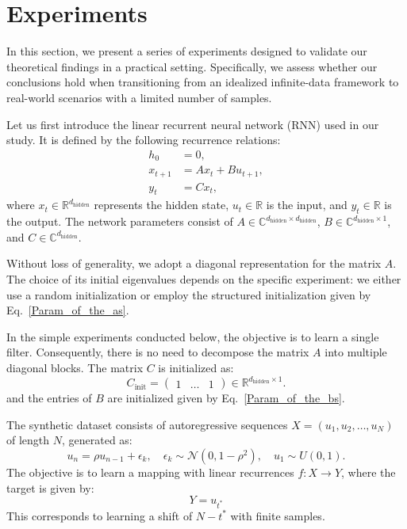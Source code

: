 \section{Experiments}


In this section, we present a series of experiments designed to validate our theoretical findings in a practical setting. Specifically, we assess whether our conclusions hold when transitioning from an idealized infinite-data framework to real-world scenarios with a limited number of samples. 

Let us first introduce the linear recurrent neural network (RNN) used in our study. It is defined by the following recurrence relations:
\begin{align*}
    h_0 &= 0, \\
    x_{t+1} &= Ax_t + Bu_{t+1}, \\
    y_t &= Cx_t,
\end{align*}
where $x_t \in \mathbb{R}^{d_{\text{hidden}}}$ represents the hidden state, $u_t \in \mathbb{R}$ is the input, and $y_t \in \mathbb{R}$ is the output. The network parameters consist of $A \in \mathbb{C}^{d_{\text{hidden}} \times d_{\text{hidden}}}$, $B \in \mathbb{C}^{d_{\text{hidden}} \times 1}$, and $C \in \mathbb{C}^{d_{\text{hidden}}}$. 

Without loss of generality, we adopt a diagonal representation for the matrix $A$. The choice of its initial eigenvalues depends on the specific experiment: we either use a random initialization or employ the structured initialization given by Eq.~\eqref{Param_of_the_as}. 

In the simple experiments conducted below, the objective is to learn a single filter. Consequently, there is no need to decompose the matrix $A$ into multiple diagonal blocks. The matrix $C$ is initialized as:
\[
C_{\text{init}} = \begin{pmatrix} 1 & \dots & 1 \end{pmatrix} \in \mathbb{R}^{d_{\text{hidden}} \times 1}.
\]
and the entries of $B$ are initialized given by Eq.~\eqref{Param_of_the_bs}.\newline

The synthetic dataset consists of autoregressive sequences $X = (u_1, u_2, \dots, u_N)$ of length $N$, generated as:
\begin{equation}
    u_n = \rho u_{n-1} + \epsilon_k, \quad \epsilon_k \sim \mathcal{N}(0, 1 - \rho^2), \quad u_1 \sim U(0,1).
\end{equation}
The objective is to learn a mapping with linear recurrences $f: X \to Y$, where the target is given by:
\begin{equation}
    Y = u_{t^*}
\end{equation}
This corresponds to learning a shift of $N - t^*$ with finite samples. 


